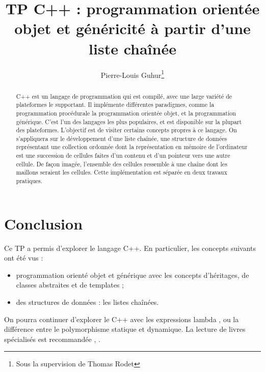 \documentclass[abstracton]{scrartcl}
\title{TP C++ : programmation orientée objet et généricité à partir d'une liste chaînée}
\author{Pierre-Louis Guhur\footnote{Sous la supervision de Thomas Rodet}}
\newcommand*{\rootPath}{./}
\begin{document}
\maketitle

\begin{abstract}
C++ est un langage de programmation qui est compilé, avec une large variété de plateformes le supportant.
Il implémente différentes paradigmes, comme la programmation procédurale  la programmation orientée objet, et la programmation générique.
C'est l'un des langages les plus populaires, et est disponible sur la plupart des plateformes.
L'objectif est de visiter certains concepts propres à ce langage.
On s'appliquera sur le développement d'une liste chaînée, une structure de données représentant une collection ordonnée dont la représentation en mémoire de l'ordinateur est une succession de cellules faites d'un contenu et d'un pointeur vers une autre cellule. De façon imagée, l'ensemble des cellules ressemble à une chaîne dont les maillons seraient les cellules.
Cette implémentation est séparée en deux travaux pratiques.
\end{abstract}











\section{Conclusion}
\label{sec:ccl}


Ce TP a permis d'explorer le langage C++. En particulier, les concepts suivants ont été vus :
\begin{itemize}
    \item programmation orienté objet et générique avec les concepts d'héritages, de classes abstraites et de templates ;
    \item des structures de données : les listes chaînées.
\end{itemize}
On pourra continuer d'explorer le C++ avec les expressions lambda \cite{lambda}, ou la différence entre le polymorphisme statique et dynamique. La lecture de livres spécialisés est recommandée \cite{gamma1995design}, \cite{jumpingallain}.




\ifstandalone

    \appendix
    \printglossary[title=Vocabulaire et abbréviations]
	
	
\fi
\end{document}
